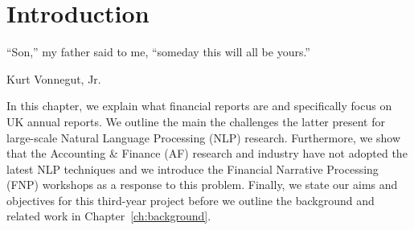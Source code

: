 \chapter{Introduction}\label{ch:introduction}
\epigraph{``Son,'' my father said to me, ``someday this will all be yours.''}{Kurt Vonnegut, Jr.}

In this chapter, we explain what financial reports are and specifically focus on UK annual reports.
We outline the main the challenges the latter present for large-scale Natural Language Processing (NLP) research.
Furthermore, we show that the Accounting \& Finance (AF) research and industry have not adopted the latest NLP techniques
and we introduce the Financial Narrative Processing (FNP) workshops as a response to this problem.
Finally, we state our aims and objectives for this third-year project before we outline the background and related work in Chapter~\ref{ch:background}.

